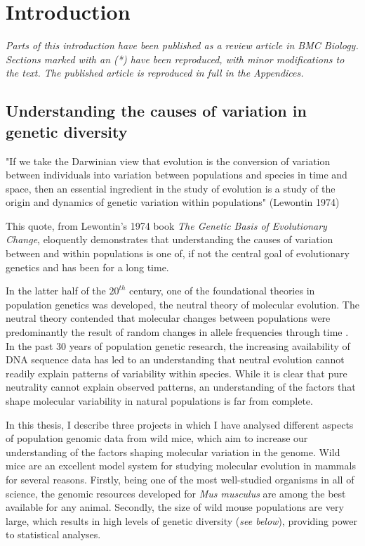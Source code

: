 \chapter{Introduction}



	\textit{Parts of this introduction have been published as a review article in BMC Biology. Sections marked with an (*) have been reproduced, with minor modifications to the text. The published article is reproduced in full in the Appendices.}

\section{Understanding the causes of variation in genetic diversity}

	"If we take the Darwinian view that evolution is the conversion of variation between individuals into variation between populations and species in time and space, then an essential ingredient in the study of evolution is a study of the origin and dynamics of genetic variation within populations" (Lewontin 1974)
	
\noindent
This quote, from Lewontin's 1974 book \textit{The Genetic Basis of Evolutionary Change}, eloquently demonstrates that understanding the causes of variation between and within populations is one of, if not the central goal of evolutionary genetics and has been for a long time.
	
	 In the latter half of the $20^{th}$ century, one of the foundational theories in population genetics was developed, the neutral theory of molecular evolution. The neutral theory contended that molecular changes between populations were predominantly the result of random changes in allele frequencies through time \citep{RN175}. In the past 30 years of population genetic research, the increasing availability of DNA sequence data has led to an understanding that neutral evolution cannot readily explain patterns of variability within species. While it is clear that pure neutrality cannot explain observed patterns, an understanding of the factors that shape molecular variability in natural populations is far from complete.

	In this thesis, I describe three projects in which I have analysed different aspects of population genomic data from wild mice, which aim to increase our understanding of the factors shaping molecular variation in the genome. Wild mice are an excellent model system for studying molecular evolution in mammals for several reasons. Firstly, being one of the most well-studied organisms in all of science, the genomic resources developed for \textit{Mus musculus} are among the best available for any animal. Secondly, the size of wild mouse populations are very large, which results in high levels of genetic diversity (\textit{see below}), providing power to statistical analyses. 

